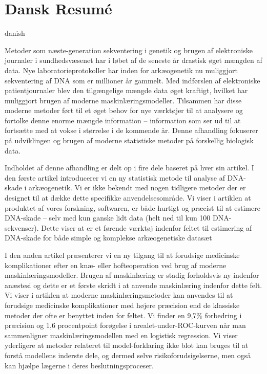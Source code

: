 \chapter{Dansk Resumé}

\begin{otherlanguage*}{danish}


    Metoder som næste-generation sekventering i genetik og brugen af elektroniske journaler i sundhedsvæsenet har i løbet af de seneste år drastisk øget mængden af data. Nye laboratorieprotokoller har inden for arkæogenetik nu muliggjort sekventering af DNA som er millioner år gammelt. Med indførslen af elektroniske patientjournaler blev den tilgængelige mængde data øget kraftigt, hvilket har muliggjort brugen af moderne maskinlæringsmodeller. Tilsammen har disse moderne metoder ført til et øget behov for nye værktøjer til at analysere og fortolke denne enorme mængde information -- information som ser ud til at fortsætte med at vokse i størrelse i de kommende år. Denne afhandling fokuserer på udviklingen og brugen af moderne statistiske metoder på forskellig biologisk data.

    Indholdet af denne afhandling er delt op i fire dele baseret på hver sin artikel. I den første artikel introducerer vi en ny statistisk metode til analyse af DNA-skade i arkæogenetik. Vi er ikke bekendt med nogen tidligere metoder der er designet til at dække dette specifikke anvendelsesområde.
    Vi viser i artiklen at produktet af vores forskning, \metaDMG softwaren, er både hurtigt og præcist til at estimere DNA-skade -- selv med kun ganske lidt data (helt ned til kun 100 DNA-sekvenser). Dette viser at \metaDMG er et førende værktøj indenfor feltet til estimering af DNA-skade for både simple og komplekse arkæogenetiske datasæt

    I den anden artikel præsenterer vi en ny tilgang til at forudsige medicinske komplikationer efter en knæ- eller hofteoperation ved brug af moderne maskinlæringsmodeller. Brugen af maskinlæring er stadig forholdsvis ny indenfor anæstesi og dette er et første skridt i at anvende maskinlæring indenfor dette felt. Vi viser i artiklen at moderne maskinlæringsmetoder kan anvendes til at forudsige medicinske komplikationer med højere præcision end de klassiske metoder der ofte er benyttet inden for feltet.
    Vi finder en 9,7\% forbedring i præcision og 1,6 procentpoint forøgelse i arealet-under-ROC-kurven når man sammenligner maskinlæringsmodellen med en logistisk regression. Vi viser yderligere at metoder relateret til model-forklaring ikke blot kan bruges til at forstå modellens inderste dele, og dermed selve risikoforudsigelserne, men også kan hjælpe lægerne i deres beslutningsproceser.


\end{otherlanguage*}
